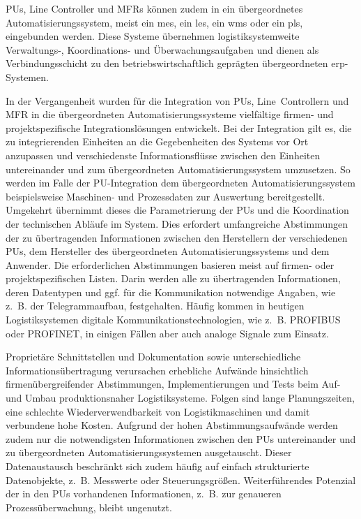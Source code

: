 PUs, Line Controller und MFRs können zudem in ein übergeordnetes Automatisierungssystem, meist ein \gls{mes}, ein \gls{les}, ein \gls{wms} oder ein \gls{pls}, eingebunden werden. Diese Systeme übernehmen logistiksystemweite Verwaltungs-, Koordinations- und Überwachungsaufgaben und dienen als Verbindungsschicht zu den betriebswirtschaftlich geprägten übergeordneten \gls{erp}-Systemen. \cite{Kilger.2006,Munnemann.2008,Lenz.2017}

In der Vergangenheit wurden für die Integration von PUs, Line~Controllern und MFR in die übergeordneten Automatisierungssysteme vielfältige firmen- und projekt\-spezifische Integrationslösungen entwickelt. Bei der Integration gilt es, die zu integrierenden Einheiten an die Gegebenheiten des Systems vor Ort anzupassen und verschiedenste Informationsflüsse zwischen den Einheiten untereinander und zum übergeordneten Automatisierungssystem umzusetzen. So werden im Falle der PU-Integration dem übergeordneten Automatisierungssystem beispielsweise Maschinen- und Prozessdaten zur Auswertung bereitgestellt. Umgekehrt übernimmt dieses die Parametrierung der PUs und die Koordination der technischen Abläufe im System. Dies erfordert umfangreiche Abstimmungen der zu übertragenden Informationen zwischen den Herstellern der verschiedenen PUs, dem Hersteller des übergeordneten Automatisierungssystems und dem Anwender. Die erforderlichen Abstimmungen basieren meist auf firmen- oder projektspezifischen Listen. Darin werden alle zu übertragenden Informationen, deren Datentypen und ggf. für die Kommunikation notwendige Angaben, wie z.~B. der Telegrammaufbau, festgehalten. Häufig kommen in heutigen Logistiksystemen digitale Kommunikationstechnologien, wie z.~B. PROFIBUS oder PROFINET, in einigen Fällen aber auch analoge Signale zum Einsatz. \cite{Gunther.2003,Kilger.2006,Lenz.2017,NAMURAK4.19.2023}

Proprietäre Schnittstellen und Dokumentation sowie unterschiedliche Informationsübertragung verursachen erhebliche Aufwände hinsichtlich firmenübergreifender Abstimmungen, Implementierungen und Tests beim Auf- und Umbau produktionsnaher Logistiksysteme. Folgen sind lange Planungszeiten, eine schlechte Wiederverwendbarkeit von Logistikmaschinen und damit verbundene hohe Kosten. Aufgrund der hohen Abstimmungsaufwände werden zudem nur die notwendigsten Informationen zwischen den PUs untereinander und zu übergeordneten Automatisierungssystemen ausgetauscht. Dieser Datenaustausch beschränkt sich zudem häufig auf einfach strukturierte Datenobjekte, z.~B. Messwerte oder Steuerungsgrößen. Weiterführendes Potenzial der in den PUs vorhandenen Informationen, z.~B. zur genaueren Prozessüberwachung, bleibt ungenutzt. \cite{NAMURAK4.19.2023,Lenz.2017}

